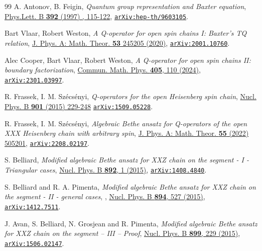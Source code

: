 \documentclass[a4paper,11pt]{article}
\numberwithin{equation}{section}
\begin{document}
\begin{thebibliography}{99}
A. Antonov, B. Feigin, \textit{Quantum group representation and Baxter equation},
\href{https://www.sciencedirect.com/science/article/pii/S0370269396015262?via%3Dihub}{Phys.Lett. B \textbf{392} (1997) , 115-122}, \href{https://arxiv.org/abs/hep-th/9603105}{\texttt{arXiv:hep-th/9603105}}.


Bart Vlaar, Robert Weston, {\em A Q-operator for open spin chains I: Baxter's TQ relation}, \href{https://iopscience.iop.org/article/10.1088/1751-8121/ab8854}{J. Phys. A: Math. Theor. \textbf{53} 245205 (2020)}, \href{https://arxiv.org/abs/2001.10760}{\texttt{arXiv:2001.10760}}.

Alec Cooper, Bart Vlaar, Robert Weston, {\em A Q-operator for open spin chains II: boundary factorization},  \href{https://link.springer.com/article/10.1007/s00220-024-04973-0}{Commun. Math. Phys. \textbf{405}, 110 (2024)}, \href{https://arxiv.org/abs/2301.03997}{\texttt{arXiv:2301.03997}}.

 R. Frassek, I. M. Szécsényi,
\textit{Q-operators for the open Heisenberg spin chain},
\href{https://doi.org/10.1016/j.nuclphysb.2015.10.010}
{Nucl. Phys. B \textbf{901} (2015) 229-248}
\href{https://doi.org/10.48550/arXiv.1509.05228}
{\texttt{\href{https://arxiv.org/abs/1509.05228}{\texttt{arXiv:1509.05228}}}}.

R. Frassek, I. M. Sz\'ecs\'enyi, \textit{Algebraic Bethe ansatz for Q-operators of the open XXX Heisenberg chain with arbitrary spin},
\href{https://doi.org/10.1088/1751-8121/aca5d3}{J. Phys. A: Math. Theor. \textbf{55} (2022) 505201}, \href{https://arxiv.org/abs/2208.02197}{\texttt{arXiv:2208.02197}}.


S. Belliard, \textit{Modified algebraic Bethe ansatz for XXZ chain on the segment - I - Triangular cases}, \href{https://doi.org/10.1016/j.nuclphysb.2015.01.003}{Nucl. Phys. B \textbf{892}, 1 (2015)},
\href{https://arxiv.org/abs/1408.4840}{\tt arXiv:1408.4840}.

S. Belliard and R. A. Pimenta,
\textit{Modified algebraic Bethe ansatz for XXZ chain on the segment - II - general cases},
, \href{https://doi.org/10.1016/j.nuclphysb.2015.03.016}{Nucl. Phys. B \textbf{894}, 527 (2015)},
\href{https://arxiv.org/abs/1412.7511}{\tt arXiv:1412.7511}.

J. Avan, S. Belliard, N. Grosjean and R. Pimenta,
\textit{Modified algebraic Bethe ansatz for XXZ chain on the segment – III – Proof},
\href{https://doi.org/10.1016/j.nuclphysb.2015.08.006}{Nucl. Phys. B \textbf{899}, 229 (2015)},
\href{https://arxiv.org/abs/1506.02147}{\tt arXiv:1506.02147}.


\end{thebibliography}
\end{document}
